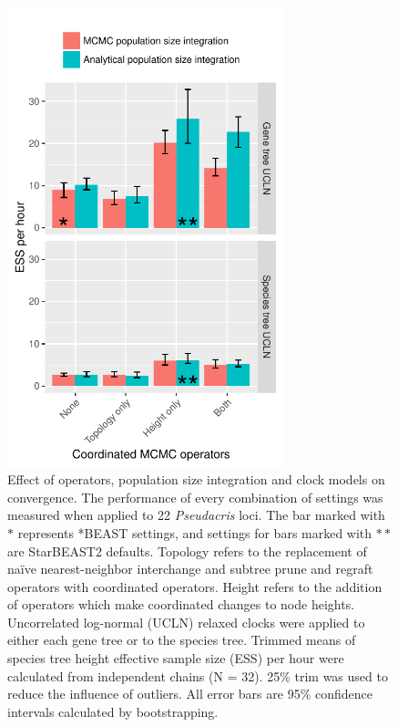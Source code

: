 \documentclass[nogrid]{MBE}%
\begin{document}
\begin{figure}[htb!]
\centering
\includegraphics[width=8cm]{speciesTreeHeight_ess_per_hour.pdf}
\caption
{Effect of operators, population size integration and clock models on
convergence. The performance of every combination of settings was measured when
applied to 22 \textit{Pseudacris} loci. The bar marked with $\ast$ represents *BEAST
settings, and settings for bars marked with $\ast\ast$ are StarBEAST2 defaults. Topology refers to the
replacement of na\"ive nearest-neighbor interchange and subtree prune and regraft operators with coordinated operators. Height
refers to the addition of operators which make coordinated changes to
node heights. Uncorrelated log-normal (UCLN) relaxed clocks were applied
to either each gene tree or to the species tree. Trimmed means of species tree
height effective sample size (ESS) per hour were calculated from independent
chains (N = 32). 25\% trim was used to reduce the influence of outliers. All error bars
are 95\% confidence intervals calculated by bootstrapping.}
\label{fig:realEssPerHour}
\end{figure}
\end{document}
